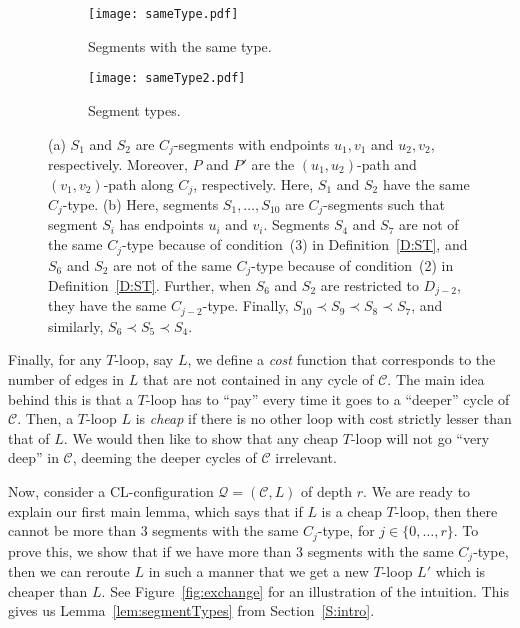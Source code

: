 \documentclass{article}
\numberwithin{claimcounter}{lemma}
\begin{document}
\begin{figure}[H]
\centering
\begin{subfigure}{.5\textwidth}
  \centering
  \captionsetup{justification=centering}
  \texttt{[image: sameType.pdf]}
  \caption{Segments with the same type.}
  \label{fig:sa}
\end{subfigure}\begin{subfigure}{.5\textwidth}
  \centering
  \captionsetup{justification=centering}
  \texttt{[image: sameType2.pdf]}
  \caption{Segment types.}
  \label{fig:sb}
\end{subfigure}
\caption{(a) $S_1$ and $S_2$ are $C_j$-segments with endpoints $u_1,v_1$ and $u_2,v_2$, respectively. Moreover, $P$ and $P'$ are the $(u_1,u_2)$-path and $(v_1,v_2)$-path along $C_j$, respectively. Here, $S_1$ and $S_2$ have the same $C_j$-type. (b) Here, segments $S_1,\ldots,S_{10}$ are $C_j$-segments such that segment $S_i$ has endpoints $u_i$ and $v_i$.  Segments $S_4$ and $S_7$ are not of the same $C_j$-type because of condition~(3) in Definition~\ref{D:ST}, and $S_6$ and $S_2$ are not of the same $C_j$-type because of condition~(2) in Definition~\ref{D:ST}. Further, when $S_6$ and $S_2$ are restricted to $D_{j-2}$, they have the same $C_{j-2}$-type. Finally, $S_{10}\prec S_9 \prec S_8 \prec S_7$, and similarly, $S_6\prec S_5\prec S_4$.}
\label{fig:seg}
\end{figure}




Finally, for any $T$-loop, say $L$, we define a \textit{cost} function that corresponds to the number of edges in $L$ that are not contained in any cycle of $\mathcal{C}$. The main idea behind this is that a $T$-loop has to ``pay'' every time it goes to a ``deeper'' cycle of $\mathcal{C}$. Then, a $T$-loop $L$ is \textit{cheap} if there is no other loop with cost strictly lesser than that of $L$. We would then like to show that any cheap $T$-loop will not go ``very deep'' in $\mathcal{C}$, deeming the deeper cycles of $\mathcal{C}$  irrelevant.

Now, consider a CL-configuration $\mathcal{Q} = (\mathcal{C},L)$ of depth $r$. We are ready to explain our first main lemma, which says that if $L$ is a cheap $T$-loop, then there cannot be more than 3 segments with the same $C_j$-type, for  $j\in \{0,\dots,r\}$. To prove this, we show that if we have more than 3 segments with the same $C_j$-type, then we can reroute $L$ in such a manner that we get a new $T$-loop $L'$ which is cheaper than $L$. See Figure~\ref{fig:exchange} for an illustration of the intuition. This gives us Lemma~\ref{lem:segmentTypes} from Section~\ref{S:intro}.
\end{document}
